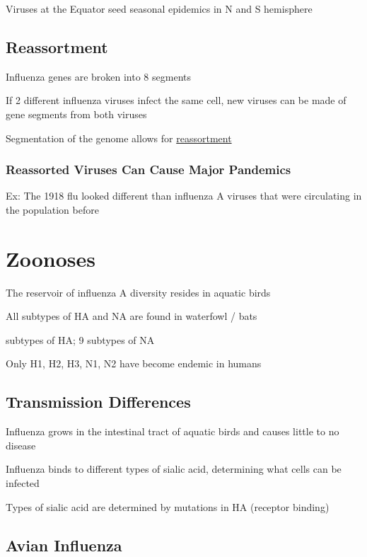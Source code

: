 \documentclass{notes}
\begin{document}
\tab \indicates Viruses at the Equator seed seasonal epidemics in N and S hemisphere

\subsection{Reassortment}

Influenza genes are broken into 8 segments

If 2 different influenza viruses infect the same cell, new viruses can be made of gene segments from both viruses

\tab \indicates Segmentation of the genome allows for \underline{reassortment}

\subsubsection{Reassorted Viruses Can Cause Major Pandemics}

\tab Ex: The 1918 flu looked different than influenza A viruses that were circulating in the population before


\section{Zoonoses}

The reservoir of influenza A diversity resides in aquatic birds

\tab All subtypes of HA and NA are found in waterfowl / bats

\tab {} subtypes of HA; 9 subtypes of NA

Only H1, H2, H3, N1, N2 have become endemic in humans

\subsection{Transmission Differences}

Influenza grows in the intestinal tract of aquatic birds and causes little to no disease

Influenza binds to different types of sialic acid, determining what cells can be infected

\tab Types of sialic acid are determined by mutations in HA (receptor binding)

\subsection{Avian Influenza}
\end{document}
